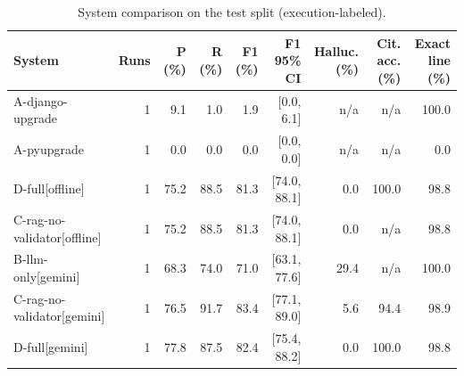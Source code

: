 \begin{table}[t]
\centering
\small
\caption{System comparison on the test split (execution-labeled).}
\label{tab:comparison-test}
\begin{tabular}{lrrrrrrrr}
\toprule
System & Runs & P (\%) & R (\%) & F1 (\%) & F1 95\% CI & Halluc. (\%) & Cit. acc. (\%) & Exact line (\%) \\
\midrule
A-django-upgrade & 1 & 9.1 & 1.0 & 1.9 & [0.0, 6.1] & n/a & n/a & 100.0 \\
A-pyupgrade & 1 & 0.0 & 0.0 & 0.0 & [0.0, 0.0] & n/a & n/a & 0.0 \\
D-full[offline] & 1 & 75.2 & 88.5 & 81.3 & [74.0, 88.1] & 0.0 & 100.0 & 98.8 \\
C-rag-no-validator[offline] & 1 & 75.2 & 88.5 & 81.3 & [74.0, 88.1] & 0.0 & n/a & 98.8 \\
B-llm-only[gemini] & 1 & 68.3 & 74.0 & 71.0 & [63.1, 77.6] & 29.4 & n/a & 100.0 \\
C-rag-no-validator[gemini] & 1 & 76.5 & 91.7 & 83.4 & [77.1, 89.0] & 5.6 & 94.4 & 98.9 \\
D-full[gemini] & 1 & 77.8 & 87.5 & 82.4 & [75.4, 88.2] & 0.0 & 100.0 & 98.8 \\
\bottomrule
\end{tabular}
\end{table}
